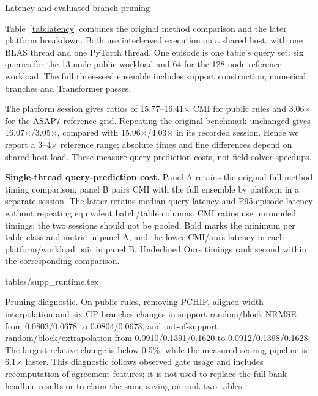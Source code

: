 \documentclass{article}
\makeatletter
\renewcommand{\section}{\@startsection{section}{1}{\z@}
  {-8pt plus -2pt minus -1pt}{4pt}{\large\sc\raggedright}}
\renewcommand{\paragraph}{\@startsection{paragraph}{4}{\z@}
  {4pt plus 1pt minus 1pt}{-1em}{\normalsize\bf}}
\newcommand{\tabdir}{tables}
\newcommand{\tableinput}[1]{\@@input \tabdir/#1 }
\makeatother
\begin{document}
\section{Latency and evaluated branch pruning}
\label{app:latency}

Table~\ref{tab:latency} combines the original method comparison and the
later platform breakdown. Both use interleaved execution on a shared host,
with one BLAS thread and one PyTorch thread. One episode is one table's
query set: six queries for the 13-node public workload and 64 for the
128-node reference workload. The full three-seed ensemble includes support
construction, numerical branches and Transformer passes.

The platform session gives ratios of 15.77--16.41$\times$ CMI for public
rules and 3.06$\times$ for the ASAP7 reference grid. Repeating the original
benchmark unchanged gives 16.07$\times$/3.05$\times$, compared with
15.96$\times$/4.03$\times$ in its recorded session. Hence we report a
3--4$\times$ reference range; absolute times and fine differences depend on
shared-host load. These measure query-prediction costs, not field-solver speedups.

\begin{table}[htbp]
\centering
\caption{\textbf{Single-thread query-prediction cost.} Panel A retains the original
full-method timing comparison; panel B pairs CMI with the full ensemble by
platform in a separate session. The latter retains median query latency and
P95 episode latency without repeating equivalent batch/table columns.
CMI ratios use unrounded timings; the two sessions should not be pooled.
Bold marks the minimum per table class and metric in panel A, and the
lower CMI/ours latency in each platform/workload pair in panel B.
Underlined Ours timings rank second within the corresponding comparison.}
\label{tab:latency}\label{tab:timing}\label{tab:costplatform}
\tableinput{supp_runtime.tex}
\end{table}

\paragraph{Pruning diagnostic.}
On public rules, removing PCHIP, aligned-width interpolation and six GP
branches changes in-support random/block NRMSE from 0.0803/0.0678 to
0.0804/0.0678, and out-of-support random/block/extrapolation from
0.0910/0.1391/0.1620 to 0.0912/0.1398/0.1628. The largest relative change
is below 0.5\%, while the measured scoring pipeline is 6.1$\times$ faster.
This diagnostic follows observed gate usage and includes recomputation of
agreement features; it is not used to replace the full-bank headline results
or to claim the same saving on rank-two tables.
\end{document}

